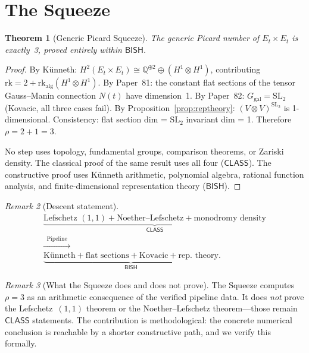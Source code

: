 \documentclass[11pt]{article}
\theoremstyle{plain}
\newtheorem{theorem}{Theorem}[section]
\theoremstyle{definition}
\theoremstyle{remark}
\newtheorem{remark}[theorem]{Remark}
\newcommand{\Q}{\mathbb{Q}}
\newcommand{\SL}{\mathrm{SL}}
\newcommand{\rk}{\mathrm{rk}}
\newcommand{\Ggal}{G_{\mathrm{gal}}}
\newcommand{\BISH}{\mathsf{BISH}}
\newcommand{\CLASS}{\mathsf{CLASS}}
\begin{document}
\section{The Squeeze}
\label{sec:squeeze}

\begin{theorem}[Generic Picard Squeeze]\label{thm:squeeze}
The generic Picard number of $E_t \times E_t$ is exactly~3, proved entirely within $\BISH$.
\end{theorem}

\begin{proof}
By K\"unneth: $H^2(E_t \times E_t) \cong \Q^{\oplus 2} \oplus (H^1 \otimes H^1)$, contributing $\rk = 2 + \rk_{\text{alg}}(H^1 \otimes H^1)$.
By Paper~81: the constant flat sections of the tensor Gauss--Manin connection $N(t)$ have dimension~1.
By Paper~82: $\Ggal = \SL_2$ (Kovacic, all three cases fail).
By Proposition~\ref{prop:reptheory}: $(V \otimes V)^{\SL_2}$ is 1-dimensional.
Consistency: flat section dim = $\SL_2$ invariant dim = 1.
Therefore $\rho = 2 + 1 = 3$.

No step uses topology, fundamental groups, comparison theorems, or Zariski density.
The classical proof of the same result uses all four ($\CLASS$).
The constructive proof uses K\"unneth arithmetic, polynomial algebra, rational function analysis, and finite-dimensional representation theory ($\BISH$).
\end{proof}

\begin{remark}[Descent statement]
\begin{gather*}
  \underbrace{\text{Lefschetz }(1,1) + \text{Noether--Lefschetz} + \text{monodromy density}}_{\CLASS}\\
  \xrightarrow{\;\;\text{Pipeline}\;\;}\\
  \underbrace{\text{K\"unneth} + \text{flat sections} + \text{Kovacic} + \text{rep.\ theory}}_{\BISH}.
\end{gather*}
\end{remark}

\begin{remark}[What the Squeeze does and does not prove]
The Squeeze computes $\rho = 3$ as an arithmetic consequence of the verified pipeline data.
It does \emph{not} prove the Lefschetz~$(1,1)$ theorem or the Noether--Lefschetz theorem---those remain $\CLASS$ statements.
The contribution is methodological: the concrete numerical conclusion is reachable by a shorter constructive path, and we verify this formally.
\end{remark}
\end{document}
